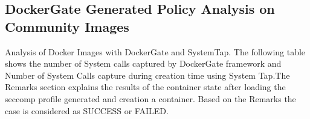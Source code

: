 \newpage
\onecolumn
\subsection{DockerGate Generated Policy Analysis on Community Images}

Analysis of Docker Images with DockerGate and SystemTap. The following table shows the number of System calls captured by DockerGate framework and Number of System Calls capture during creation time using System Tap.The Remarks section explains the results of the container state after loading the seccomp profile generated and creation a container. Based on the Remarks the case is considered as SUCCESS or FAILED.

